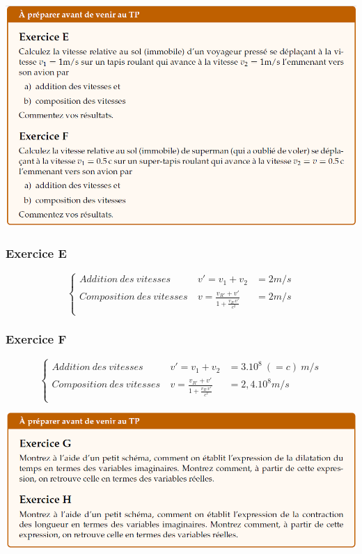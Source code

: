 \documentclass	[11pt, a4paper, openany]{book}
\begin{document}
\begin{center}
\includegraphics[scale=0.60]{prepa/physmE.png}\\
\end{center}
\subsubsection*{Exercice E}

$$\left\{\begin{array}{lll}
Addition\ des\ vitesses\ & v' = v_1 + v_2 & = 2m/s \\
Composition\ des\ vitesses\ & v = \frac{v_{R'} + v'}{1 + \frac{v_{R'}v'}{c^2}} & = 2m/s\\
\end{array}\right.$$

\subsubsection*{Exercice F}
$$\left\{\begin{array}{lll}
Addition\ des\ vitesses\ & v' = v_1 + v_2 & = 3.10^8\ (=c)\ m/s \\
Composition\ des\ vitesses\ & v = \frac{v_{R'} + v'}{1 + \frac{v_{R'}v'}{c^2}} & = 2,4.10^8m/s\\
\end{array}\right.$$

\begin{center}
\includegraphics[scale=0.60]{prepa/physmG.png}\\
\end{center}
\end{document}

